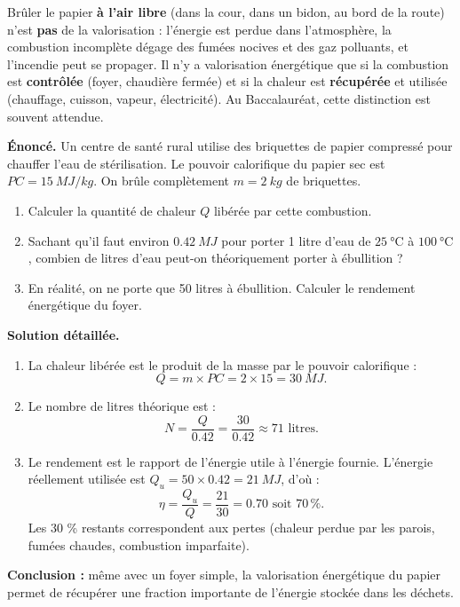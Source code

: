 \documentclass[11pt]{article}
\begin{document}
\begin{attention}
Brûler le papier \textbf{à l'air libre} (dans la cour, dans un bidon, au bord de la route) n'est \textbf{pas} de la valorisation : l'énergie est perdue dans l'atmosphère, la combustion incomplète dégage des fumées nocives et des gaz polluants, et l'incendie peut se propager. Il n'y a valorisation énergétique que si la combustion est \textbf{contrôlée} (foyer, chaudière fermée) et si la chaleur est \textbf{récupérée} et utilisée (chauffage, cuisson, vapeur, électricité). Au Baccalauréat, cette distinction est souvent attendue.
\end{attention}

\begin{exoresolu}
\textbf{Énoncé.} Un centre de santé rural utilise des briquettes de papier compressé pour chauffer l'eau de stérilisation. Le pouvoir calorifique du papier sec est $PC = \SI{15}{MJ/kg}$. On brûle complètement $m = \SI{2}{kg}$ de briquettes.
\begin{enumerate}
\item Calculer la quantité de chaleur $Q$ libérée par cette combustion.
\item Sachant qu'il faut environ $\SI{0,42}{MJ}$ pour porter 1 litre d'eau de $\SI{25}{\celsius}$ à $\SI{100}{\celsius}$, combien de litres d'eau peut-on théoriquement porter à ébullition ?
\item En réalité, on ne porte que 50 litres à ébullition. Calculer le rendement énergétique du foyer.
\end{enumerate}
\tcblower
\textbf{Solution détaillée.}
\begin{enumerate}
\item La chaleur libérée est le produit de la masse par le pouvoir calorifique :
\[ Q = m \times PC = 2 \times 15 = \SI{30}{MJ}. \]
\item Le nombre de litres théorique est :
\[ N = \frac{Q}{\num{0,42}} = \frac{30}{\num{0,42}} \approx 71 \text{ litres}. \]
\item Le rendement est le rapport de l'énergie utile à l'énergie fournie. L'énergie réellement utilisée est $Q_u = 50 \times \num{0,42} = \SI{21}{MJ}$, d'où :
\[ \eta = \frac{Q_u}{Q} = \frac{21}{30} = \num{0,70} \text{ soit } 70\,\%. \]
Les 30 \% restants correspondent aux pertes (chaleur perdue par les parois, fumées chaudes, combustion imparfaite).
\end{enumerate}
\textbf{Conclusion :} même avec un foyer simple, la valorisation énergétique du papier permet de récupérer une fraction importante de l'énergie stockée dans les déchets.
\end{exoresolu}
\end{document}
